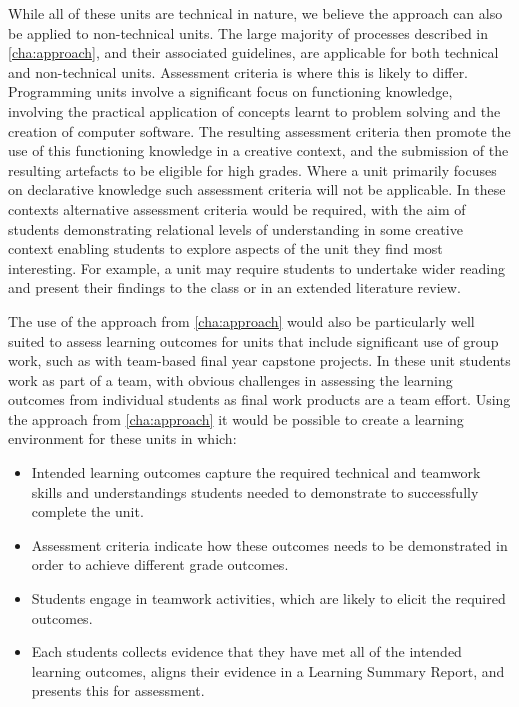 While all of these units are technical in nature, we believe the approach can also be applied to non-technical units. The large majority of processes described in \cref{cha:approach}, and their associated guidelines, are applicable for both technical and non-technical units. Assessment criteria is where this is likely to differ. Programming units involve a significant focus on functioning knowledge, involving the practical application of concepts learnt to problem solving and the creation of computer software. The resulting assessment criteria then promote the use of this functioning knowledge in a creative context, and the submission of the resulting artefacts to be eligible for high grades. Where a unit primarily focuses on declarative knowledge such assessment criteria will not be applicable. In these contexts alternative assessment criteria would be required, with the aim of students demonstrating relational levels of understanding in some creative context enabling students to explore aspects of the unit they find most interesting. For example, a unit may require students to undertake wider reading and present their findings to the class or in an extended literature review.

The use of the approach from \cref{cha:approach} would also be particularly well suited to assess learning outcomes for units that include significant use of group work, such as with team-based final year capstone projects. In these unit students work as part of a team, with obvious challenges in assessing the learning outcomes from individual students as final work products are a team effort. Using the approach from \cref{cha:approach} it would be possible to create a learning environment for these units in which:
\begin{itemize}[noitemsep,nolistsep]
	\item Intended learning outcomes capture the required technical and teamwork skills and understandings students needed to demonstrate to successfully complete the unit.
	\item Assessment criteria indicate how these outcomes needs to be demonstrated in order to achieve different grade outcomes.
	\item Students engage in teamwork activities, which are likely to elicit the required outcomes.
	\item Each students collects evidence that they have met all of the intended learning outcomes, aligns their evidence in a Learning Summary Report, and presents this for assessment.
\end{itemize}

